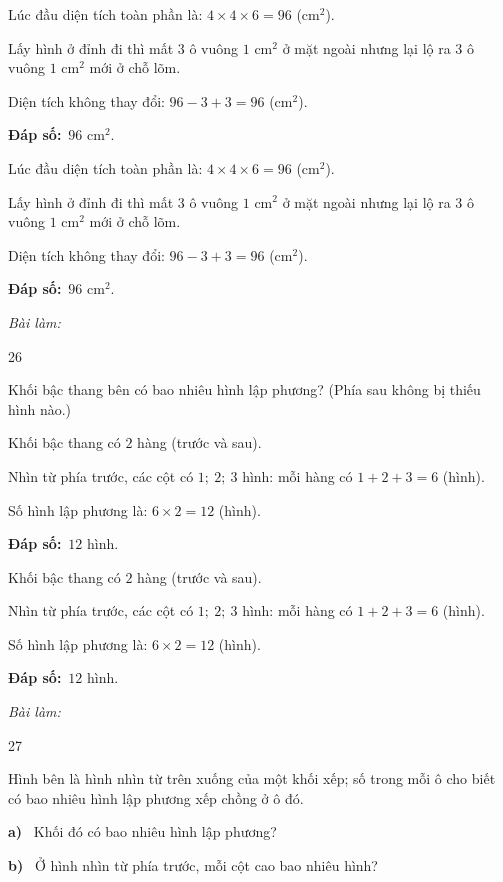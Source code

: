 \documentclass[11pt]{article}
\newif\ifsol \soltrue
\providecommand{\AnsWord}{Đáp số}
\newcommand{\dapso}[1]{\par\textbf{\AnsWord:}\ #1}
\newcommand{\probsol}[1]{%
  \begin{lrbox}{\solmeasure}\begin{minipage}{\dimexpr\linewidth-24pt\relax}#1\end{minipage}\end{lrbox}%
  \ifsol
    \begin{solbox}#1\end{solbox}%
  \else
    \setlength{\solht}{\dimexpr\ht\solmeasure+\dp\solmeasure+0.85cm\relax}%
    \ifdim\solht<1.35cm\setlength{\solht}{1.35cm}\fi
    \begin{tcolorbox}[colback=white,colframe=Line,boxrule=0.8pt,arc=5pt,
      left=8pt,right=8pt,top=4pt,bottom=4pt,height=\solht]{\footnotesize\color{Slate}\itshape\WorkWord}\end{tcolorbox}%
  \fi}
\newcommand{\pa}[1]{\textbf{#1)}\ }
\newcommand{\gap}{\vspace{0.3cm}}
\def\WorkWord{Bài làm:}
\def\AnsWord{Đáp số}
\begin{document}
\probsol{
Lúc đầu diện tích toàn phần là: $4\times4\times6=96$ (cm$^2$).\par
Lấy hình ở đỉnh đi thì mất $3$ ô vuông $1$ cm$^2$ ở mặt ngoài nhưng lại lộ ra $3$ ô vuông $1$ cm$^2$ mới ở chỗ lõm.\par
Diện tích không thay đổi: $96-3+3=96$ (cm$^2$).
\dapso{$96$ cm$^2$.}}
\gap
\begin{probbox}{26}{\relax}
\begin{minipage}[t]{0.6\linewidth}
Khối bậc thang bên có bao nhiêu hình lập phương? (Phía sau không bị thiếu hình nào.)
\end{minipage}\hfill
\begin{minipage}[t]{0.36\linewidth}\vspace{0pt}\centering
{}
\end{minipage}
\end{probbox}
\probsol{
Khối bậc thang có $2$ hàng (trước và sau).\par
Nhìn từ phía trước, các cột có $1;\ 2;\ 3$ hình: mỗi hàng có $1+2+3=6$ (hình).\par
Số hình lập phương là: $6\times2=12$ (hình).
\dapso{$12$ hình.}}
\gap
\begin{probbox}{27}{\relax}
\begin{minipage}[t]{0.6\linewidth}
Hình bên là hình nhìn từ trên xuống của một khối xếp; số trong mỗi ô cho biết có bao nhiêu hình lập phương xếp chồng ở ô đó.\par
\pa{a} Khối đó có bao nhiêu hình lập phương?\par
\pa{b} Ở hình nhìn từ phía trước, mỗi cột cao bao nhiêu hình?
\end{minipage}\hfill
\begin{minipage}[t]{0.36\linewidth}\vspace{0pt}\centering
{}
\end{minipage}
\end{probbox}
\end{document}
